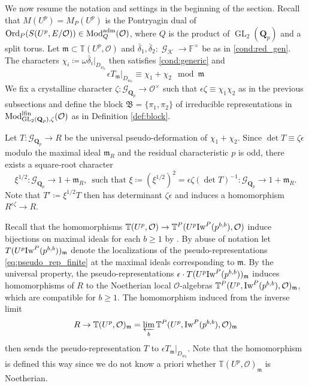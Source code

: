 \documentclass[leqno]{amsart}
\theoremstyle{definition}
\theoremstyle{remark}
\newcommand{\oo}{\mathcal{O}}
\newcommand{\fF}{\mathbb{F}} %
\newcommand{\Qp}{\mathbf{Q}_p}
\DeclareMathOperator{\GL}{GL}
\DeclareMathOperator{\Gal}{\mathcal{G}}
\newcommand{\fm}{\mathfrak{m}}
\DeclareMathOperator{\Mod}{\textnormal{Mod}}
\DeclareMathOperator{\Ord}{Ord} %
\newcommand{\Gp}{\mathcal{G}_{\Qp}} %
\newcommand{\B}{\mathfrak B} %
\newcommand{\adm}{\textnormal{adm}}
\newcommand{\lfin}{\textnormal{lfin}}
\newcommand{\K}{{\mathcal{K}}} %
\newcommand{\Iw}{\textnormal{Iw}} %
\newcommand{\TT}{\mathbb{T}} %
\begin{document}
We now resume the notation and settings in
the beginning of the section.
Recall that
$M(U^p)=M_P(U^p)$ is the Pontryagin dual of
$\Ord_P(S(U^p,E/\oo))\in \Mod_Q^{\adm}(\oo)$,
where $Q$ is the product of $\GL_2(\Qp)$ and a split torus.
Let $\fm\subset \TT(U^p,\oo)$ and
$\bar{\delta}_1,\bar{\delta}_2\colon \Gal_\K\to \fF^\times$
be as in \eqref{cond:red_gen}.
The characters
$\chi_i\coloneqq\omega{\bar{\delta}_i}\vert_{D_{w_0}}$
then satisfies \eqref{cond:generic} and
\[
	\epsilon T_\fm\vert_{D_{w_0}}\equiv
	\chi_1+\chi_2 \mod \fm
\]
We fix a crystalline character 
$\zeta\colon \Gp\to \oo^\times$ 
such that $\epsilon\zeta\equiv \chi_1\chi_2$
as in the previous subsections
and define the block $\B=\{\pi_1,\pi_2\}$
of irreducible representations
in $\Mod^{\lfin}_{\GL_2(\Qp),\zeta}(\oo)$
as in Definition \ref{def:block}.

Let $T\colon \Gp\to R$ be 
the universal pseudo-deformation of $\chi_1+\chi_2$.
Since $\det T\equiv \zeta\epsilon$ modulo
the maximal ideal $\fm_R$ and
the residual characteristic $p$ is odd,
there exists a square-root character
\begin{equation}\label{eq:root_char}
	\xi^{1/2}
    \colon \Gp\to 1+
    \fm_{R},
    \, \text{ such that }
	\xi\coloneqq(\xi^{1/2})^2=\epsilon\zeta(\det T)^{-1}
    \colon \Gp\to 1+
    \fm_{R}.
\end{equation}
Note that $T'\coloneqq \xi^{1/2}T$ then has determinant 
$\zeta\epsilon$
and induces a homomorphism $R^{\epsilon\zeta}\to R$.



Recall that the homomorphisms
$\TT(U^p,\oo)\to \TT^P(U^p\Iw^P(p^{b,b}),\oo)$
induce bijections on maximal ideals
for each $b\geq 1$ by \cite[Prop 3.3.6]{pan}.
By abuse of notation
let $T(U^p\Iw^P(p^{b,b}))_\fm$
denote the localizations of the pseudo-representations
\eqref{eq:pseudo_rep_finite} at 
the maximal ideals corresponding to $\fm$.
By the universal property,
the pseudo-representations
$\epsilon\cdot T(U^p\Iw^P(p^{b,b}))_\fm$
induces homomorphisms of $R$ 
to the Noetherian local $\oo$-algebras
$\TT^P(U^p,\Iw^P(p^{b,b}),\oo)_{\fm}$,
which are compatible for $b\geq 1$.
The homomorphism 
induced from the inverse limit
\[
    R\to \TT(U^p,\oo)_{\fm}=
    \varprojlim_b\TT^P(U^p,\Iw^P(p^{b,b}),\oo)_{\fm}
\]
then sends the pseudo-representation
$T$ to $\epsilon T_\fm\vert_{D_{w_0}}$.
Note that the homomorphism is defined this way
since we do not know a priori whether
$\TT(U^p,\oo)_{\fm}$ is Noetherian.
\end{document}
